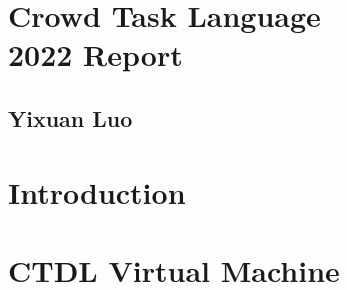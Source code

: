 \documentclass[12pt, oneside]{book}
\begin{document}
\frontmatter
%
\chapter*{\Huge \center Crowd Task Language \\ 2022 Report}
\thispagestyle{empty}
\section*{\huge \center Yixuan Luo}
%
\tableofcontents
%
\mainmatter
%
\chapter{Introduction}
%



\chapter{CTDL Virtual Machine}

\appendix

\backmatter
\end{document}
